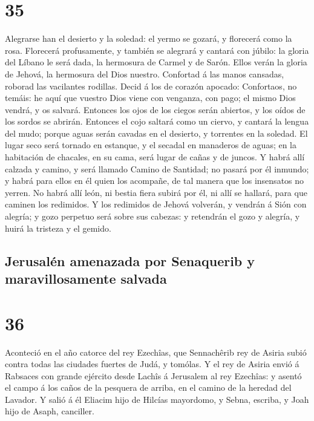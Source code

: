 \hypertarget{section-34}{%
\section{35}\label{section-34}}

 Alegrarse han el desierto y la soledad: el yermo se gozará,
y florecerá como la rosa.  Florecerá profusamente, y también
se alegrará y cantará con júbilo: la gloria del Líbano le será dada, la
hermosura de Carmel y de Sarón. Ellos verán la gloria de Jehová, la
hermosura del Dios nuestro.  Confortad á las manos cansadas,
roborad las vacilantes rodillas.  Decid á los de corazón
apocado: Confortaos, no temáis: he aquí que vuestro Dios viene con
venganza, con pago; el mismo Dios vendrá, y os salvará. 
Entonces los ojos de los ciegos serán abiertos, y los oídos de los
sordos se abrirán.  Entonces el cojo saltará como un ciervo,
y cantará la lengua del mudo; porque aguas serán cavadas en el desierto,
y torrentes en la soledad.  El lugar seco será tornado en
estanque, y el secadal en manaderos de aguas; en la habitación de
chacales, en su cama, será lugar de cañas y de juncos.  Y
habrá allí calzada y camino, y será llamado Camino de Santidad; no
pasará por él inmundo; y habrá para ellos en él quien los acompañe, de
tal manera que los insensatos no yerren.  No habrá allí
león, ni bestia fiera subirá por él, ni allí se hallará, para que
caminen los redimidos.  Y los redimidos de Jehová volverán,
y vendrán á Sión con alegría; y gozo perpetuo será sobre sus cabezas: y
retendrán el gozo y alegría, y huirá la tristeza y el gemido.

\hypertarget{jerusaluxe9n-amenazada-por-senaquerib-y-maravillosamente-salvada}{%
\subsection{Jerusalén amenazada por Senaquerib y maravillosamente
salvada}\label{jerusaluxe9n-amenazada-por-senaquerib-y-maravillosamente-salvada}}

\hypertarget{section-35}{%
\section{36}\label{section-35}}

 Aconteció en el año catorce del rey Ezechîas, que
Sennachêrib rey de Asiria subió contra todas las ciudades fuertes de
Judá, y tomólas.  Y el rey de Asiria envió á Rabsaces con
grande ejército desde Lachîs á Jerusalem al rey Ezechîas: y asentó el
campo á los caños de la pesquera de arriba, en el camino de la heredad
del Lavador.  Y salió á él Eliacim hijo de Hilcías
mayordomo, y Sebna, escriba, y Joah hijo de Asaph, canciller.


